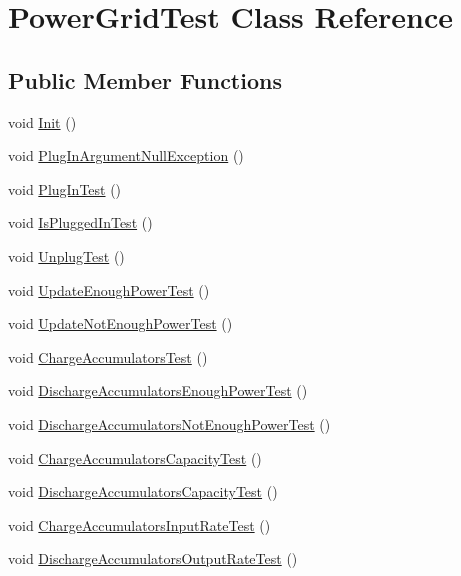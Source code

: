 \hypertarget{class_power_grid_test}{}\section{Power\+Grid\+Test Class Reference}
\label{class_power_grid_test}
\subsection*{Public Member Functions}
\begin{DoxyCompactItemize}
\item 
void \hyperlink{class_power_grid_test_a8f46f4cdc0c815921758debd6a79be7d}{Init} ()
\item 
void \hyperlink{class_power_grid_test_a09404bb9a4818d4acf205ac445faf3b5}{Plug\+In\+Argument\+Null\+Exception} ()
\item 
void \hyperlink{class_power_grid_test_aaa22ab030a08698ff9f72855372abf1e}{Plug\+In\+Test} ()
\item 
void \hyperlink{class_power_grid_test_a6304851f56f271f4d748585011ec5a45}{Is\+Plugged\+In\+Test} ()
\item 
void \hyperlink{class_power_grid_test_a1b6bca613cc9a652c43669953803dd68}{Unplug\+Test} ()
\item 
void \hyperlink{class_power_grid_test_ac2834264374318ac4c976af94542efea}{Update\+Enough\+Power\+Test} ()
\item 
void \hyperlink{class_power_grid_test_a3a8fc8ddd17a7bffc9b159b0485be944}{Update\+Not\+Enough\+Power\+Test} ()
\item 
void \hyperlink{class_power_grid_test_a4ba3cda41d700d50218753a9be76d060}{Charge\+Accumulators\+Test} ()
\item 
void \hyperlink{class_power_grid_test_a018eb2ee9eda258d6f3ce41e3c1baf8e}{Discharge\+Accumulators\+Enough\+Power\+Test} ()
\item 
void \hyperlink{class_power_grid_test_ab444c627c5f5d20a63a66034a51c4980}{Discharge\+Accumulators\+Not\+Enough\+Power\+Test} ()
\item 
void \hyperlink{class_power_grid_test_a5664e36caefc2c71c830df6188c187e0}{Charge\+Accumulators\+Capacity\+Test} ()
\item 
void \hyperlink{class_power_grid_test_a08fed2d377087cb4123191869c41f744}{Discharge\+Accumulators\+Capacity\+Test} ()
\item 
void \hyperlink{class_power_grid_test_a27e99c5afa00024d68312a965b74b625}{Charge\+Accumulators\+Input\+Rate\+Test} ()
\item 
void \hyperlink{class_power_grid_test_ac9b85f2fbb906197872deb05e64e4450}{Discharge\+Accumulators\+Output\+Rate\+Test} ()
\end{DoxyCompactItemize}


